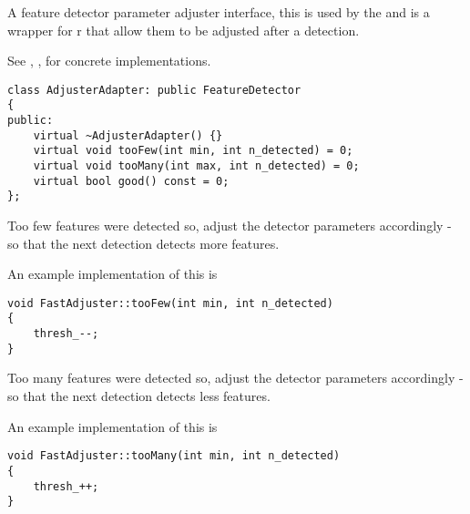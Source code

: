\begin{description}  
\end{description}

A feature detector parameter adjuster interface, this is used by the 
and is a wrapper for  r that allow them to be adjusted after a detection.

See  , ,  for concrete implementations.
\begin{lstlisting}
class AdjusterAdapter: public FeatureDetector 
{
public:
	virtual ~AdjusterAdapter() {}
	virtual void tooFew(int min, int n_detected) = 0;
	virtual void tooMany(int max, int n_detected) = 0;
	virtual bool good() const = 0;
};
\end{lstlisting}
Too few features were detected so, adjust the detector parameters accordingly - so that the next
detection detects more features.
\begin{description}
\end{description}
An example implementation of this is
\begin{lstlisting}
void FastAdjuster::tooFew(int min, int n_detected) 
{
	thresh_--;
}
\end{lstlisting}

Too many features were detected so, adjust the detector parameters accordingly - so that the next
detection detects less features.
\begin{description}
\end{description}
An example implementation of this is
\begin{lstlisting}
void FastAdjuster::tooMany(int min, int n_detected) 
{
	thresh_++;
}
\end{lstlisting}


